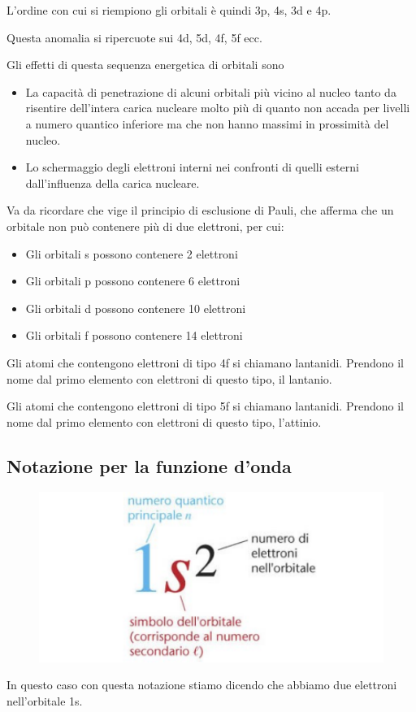 L'ordine con cui si riempiono gli orbitali è quindi 3p, 4s, 3d e 4p.

Questa anomalia si ripercuote sui 4d, 5d, 4f, 5f ecc.

Gli effetti di questa sequenza energetica di orbitali sono
\begin{itemize}
  \item La capacità di penetrazione di alcuni orbitali più vicino al nucleo tanto da risentire dell'intera carica nucleare molto più di quanto non accada per livelli a numero quantico inferiore ma che non hanno massimi in prossimità del nucleo.
  \item Lo schermaggio degli elettroni interni nei confronti di quelli esterni dall'influenza della carica nucleare.
\end{itemize}
Va da ricordare che vige il principio di esclusione di Pauli, che afferma che un orbitale non può contenere più di due elettroni, per cui:
\begin{itemize}
  \item Gli orbitali s possono contenere 2 elettroni
  \item Gli orbitali p possono contenere 6 elettroni
  \item Gli orbitali d possono contenere 10 elettroni
  \item Gli orbitali f possono contenere 14 elettroni
\end{itemize}
Gli atomi che contengono elettroni di tipo 4f si chiamano lantanidi. Prendono il nome dal primo elemento con elettroni di questo tipo, il lantanio.

Gli atomi che contengono elettroni di tipo 5f si chiamano lantanidi. Prendono il nome dal primo elemento con elettroni di questo tipo, l'attinio.
\newpage
\subsection{Notazione per la funzione d'onda}
\begin{figure}[htp]
  \centering
  \includegraphics[width=12cm]{immagini/notazione.png}
\end{figure}
In questo caso con questa notazione stiamo dicendo che abbiamo due elettroni nell'orbitale 1s.

